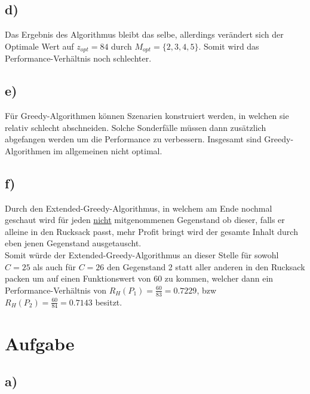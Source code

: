 \documentclass[12pt]{article}
\begin{document}
	\subsection{d)}
	Das Ergebnis des Algorithmus bleibt das selbe, allerdings verändert sich der Optimale Wert auf $z_{opt}=84$ durch $M_{opt}=\{2,3,4,5\}$. Somit wird das Performance-Verhältnis noch schlechter.
	
	\subsection{e)}
	Für Greedy-Algorithmen können Szenarien konstruiert werden, in welchen sie relativ schlecht abschneiden. Solche Sonderfälle müssen dann zusätzlich abgefangen werden um die Performance zu verbessern. Insgesamt sind Greedy-Algorithmen im allgemeinen nicht optimal.
	
	\subsection{f)}
	Durch den Extended-Greedy-Algorithmus, in welchem am Ende nochmal geschaut wird für jeden \underline{nicht} mitgenommenen Gegenstand ob dieser, falls er alleine in den Rucksack passt, mehr Profit bringt wird der gesamte Inhalt durch eben jenen Gegenstand ausgetauscht.\\
	Somit würde der Extended-Greedy-Algorithmus an dieser Stelle für sowohl $C=25$ als auch für $C=26$ den Gegenstand 2 statt aller anderen in den Rucksack packen um auf einen Funktionswert von 60 zu kommen, welcher dann ein Performance-Verhältnis von $R_H(P_1)=\frac{60}{83}=0.7229$, bzw $R_H(P_2)=\frac{60}{84}=0.7143$ besitzt.
	
	\section{Aufgabe}
	\subsection{a)}
	
\end{document}
